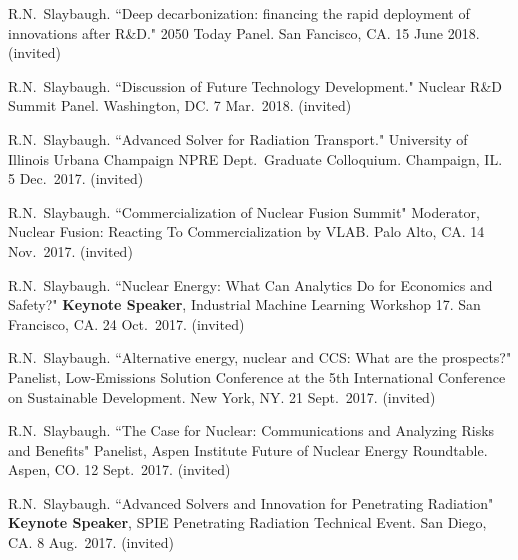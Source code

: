 \begin{bibsection}
\item R.N.\ Slaybaugh.  ``Deep decarbonization: financing the rapid deployment of innovations after R\&D." 2050 Today Panel. San Fancisco, CA. 15 June 2018. (invited)

\item R.N.\ Slaybaugh. ``Discussion of Future Technology Development." Nuclear R\&D Summit Panel. Washington, DC. 7 Mar.\ 2018. (invited)



\item R.N.\ Slaybaugh.  ``Advanced Solver for Radiation Transport." University of Illinois Urbana Champaign NPRE Dept.\ Graduate Colloquium. Champaign, IL. 5 Dec.\ 2017. (invited)

\item R.N.\ Slaybaugh. ``Commercialization of  Nuclear Fusion Summit" Moderator, Nuclear Fusion: Reacting To Commercialization by VLAB. Palo Alto, CA. 14 Nov.\ 2017. (invited)

\item R.N.\ Slaybaugh. ``Nuclear Energy: What Can Analytics Do for Economics and Safety?" \textbf{Keynote Speaker}, Industrial Machine Learning Workshop 17. San Francisco, CA. 24 Oct.\ 2017. (invited)

\item R.N.\ Slaybaugh. ``Alternative energy, nuclear and CCS: What are the prospects?" Panelist, Low-Emissions Solution Conference at the 5th International Conference on Sustainable Development. New York, NY. 21  Sept.\ 2017. (invited)

\item R.N.\ Slaybaugh. ``The Case for Nuclear: Communications and Analyzing Risks and Benefits" Panelist, Aspen Institute Future of Nuclear Energy Roundtable. Aspen, CO. 12  Sept.\ 2017. (invited)

\item R.N.\ Slaybaugh. ``Advanced Solvers and Innovation for Penetrating Radiation" \textbf{Keynote Speaker}, SPIE Penetrating Radiation Technical Event. San Diego, CA. 8 Aug.\ 2017. (invited)


\end{bibsection}
